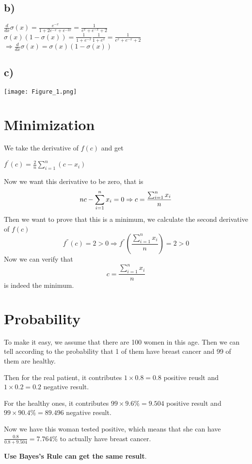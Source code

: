 \documentclass[12pt]{report}
\begin{document}
\subsection*{b)}
\begin{center}
    $\frac{d}{dx}\sigma(x) = \frac{e^{-x}}{1+2e^{-x} + e^{-2x}} = \frac{1}{e^{x}+e^{-x}+2}$ \\ 
    $\sigma(x)(1-\sigma(x)) = \frac{1}{1+e^{-x}}\frac{1}{1+e^{x}} = \frac{1}{e^{x}+e^{-x}+2}$ \\ 
    $\Rightarrow \frac{d}{dx}\sigma(x) = \sigma(x)(1-\sigma(x))$
\end{center}

\subsection*{c)}
\begin{center}
    \texttt{[image: Figure\_1.png]}
\end{center}

\section{Minimization}
We take the derivative of $f(c)$ and get
\begin{center}
    $f^{'}(c) = \frac{2}{n}\sum_{i=1}^{n}(c - x_{i})$
\end{center}
Now we want this derivative to be zero, that is
$$
    nc - \sum_{i=1}^{n}x_{i} = 0 \\ 
    \Rightarrow c = \frac{\sum_{i = 1}^{n}x_{i}}{n}
$$
Then we want to prove that this is a minimum, we calculate the second derivative of $f(c)$
$$
    f^{''}(c) = 2 >0 \Rightarrow f^{''}(\frac{\sum_{i = 1}^{n}x_{i}}{n}) = 2 >0
$$
Now we can verify that
$$
    c=\frac{\sum_{i = 1}^{n}x_{i}}{n}
$$
is indeed the minimum.

\section{Probability}
To make it easy, we assume that there are 100 women in this age. Then we can tell according to
the probability that 1 of them have breast cancer and 99 of them are healthy.
\par
Then for the real patient, it contributes $1 \times 0.8 = 0.8$ positive reuslt and $1 \times 0.2 = 0.2$ negative result.
\par
For the healthy ones, it contributes $99 \times 9.6\% = 9.504$ positive result and $99 \times 90.4\% = 89.496$ negative result.
\par
Now we have this woman tested positive, which means that she can have $\frac{0.8}{0.8+9.504}=7.764\%$ to actually have breast cancer.
\par
\textbf{Use Bayes's Rule can get the same result}.
\end{document}

